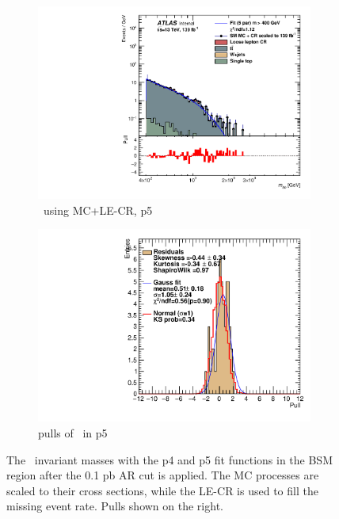 \begin{figure}[ht]
\begin{subfigure}[h]{0.38\linewidth}
    \includegraphics[scale=0.3]{figs/ch6/fit/variable_nosmooth/p5/01PB/output_SMMCplusCR_Mbb_p5.pdf}%
     \caption{\mbb \ using MC+LE-CR, p5}
     \end{subfigure}
     \hfill
    \begin{subfigure}[h]{0.4\linewidth}
    \includegraphics[scale=0.32]{figs/ch6/fit/variable_nosmooth/p5/01PB/pull_SMMCplusCR_Mbb_p5.pdf}%
    \caption{pulls of \mbb \ in p5}
    \end{subfigure}
    \caption{The \mbb \ invariant masses with the p4 and p5 fit functions in the BSM region after the 0.1 pb AR cut is applied. The MC processes are scaled to their cross sections, while the LE-CR is used to fill the missing event rate. Pulls shown on the right.}
\label{fig:mbb-fit-pulls-01pb}
\end{figure}

